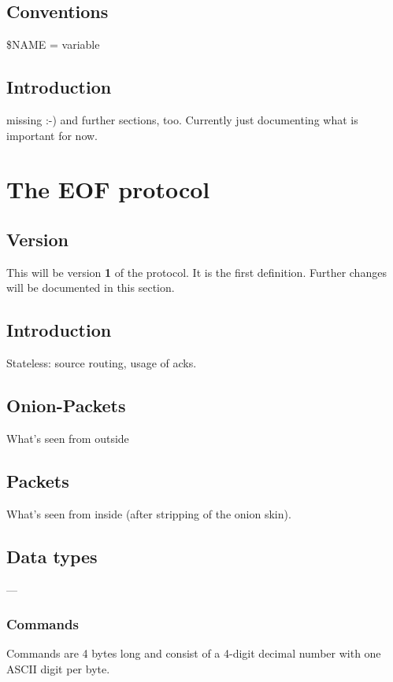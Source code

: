 \documentclass[12pt,a4paper]{book}
\begin{document}
\section{Conventions}
\$NAME = variable
\section{Introduction}
missing :-)
and further sections, too. Currently just documenting what is important
for now.
\chapter{The EOF protocol}
\section{Version}
This will be version \textbf{1} of the protocol. It is the first definition.
Further changes will be documented in this section.
\section{Introduction}
Stateless: source routing, usage of acks.
\section{Onion-Packets}
What's seen from outside
\section{Packets}
What's seen from inside (after stripping of the onion skin).
\section{Data types}
---
\subsection{Commands}
Commands are 4 bytes long and consist of a 4-digit decimal number with one ASCII digit per byte.
\end{document}
